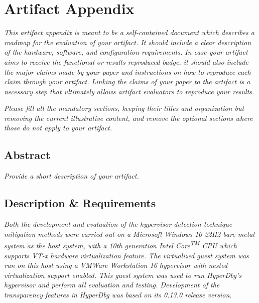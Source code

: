 
\section{Artifact Appendix}
\textit{This artifact appendix is meant to be a self-contained document which
describes a roadmap for the evaluation of your artifact. It should include a
clear description of the hardware, software, and configuration requirements. In
case your artifact aims to receive the functional or results reproduced badge,
it should also include the major claims made by your paper and instructions on
how to reproduce each claim through your artifact. Linking the claims of your
paper to the artifact is a necessary step that ultimately allows artifact
evaluators to reproduce your results.}

\textit{Please fill all the mandatory sections, keeping their titles and
organization but removing the current illustrative content, and remove the
optional sections where those do not apply to your artifact.}

\subsection{Abstract}
{\em Provide a short description of your artifact.}

\subsection{Description \& Requirements}

\textit{Both the development and evaluation of the hypervisor detection technique mitigation methods were carried out
on a Microsoft Windows 10 22H2 bare metal system as the host system, with a 10th generation Intel Core\textsuperscript{TM} CPU which supports VT-x hardware virtualization feature.
The virtualized guest system was run on this host using a VMWare Workstation 16 hypervisor with nested virtualization support enabled.
This guest system was used to run HyperDbg’s hypervisor and perform all evaluation and testing. Development of the transparency features in HyperDbg was based on its 0.13.0 release version. }

